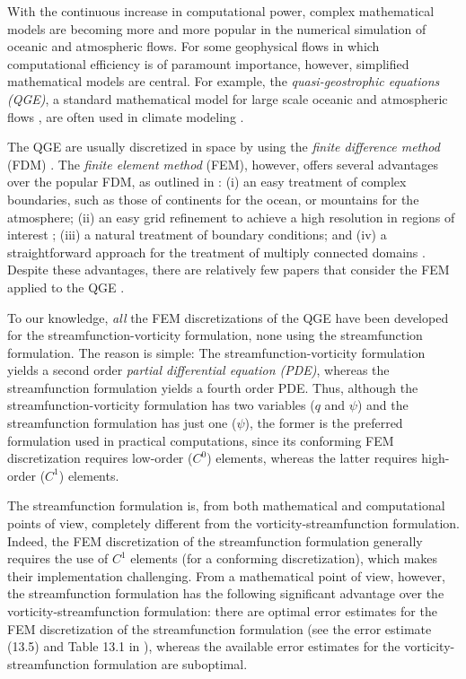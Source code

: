 With the continuous increase in computational power, complex mathematical models are becoming more
and more popular in the numerical simulation of oceanic and atmospheric flows. For some geophysical
flows in which computational efficiency is of paramount importance, however, simplified mathematical
models are central. For example, the \emph{quasi-geostrophic equations (QGE)}, a standard
mathematical model for large scale oceanic and atmospheric flows
\cite{Cushman11,Majda,Pedlosky92,Vallis06}, are often used in climate modeling \cite{Dijkstra05}.

The QGE are usually discretized in space by using the \emph{finite difference method} (FDM)
\cite{San11}. The \emph{finite element method} (FEM), however, offers several advantages over the
popular FDM, as outlined in \cite{Myers}: (i) an easy treatment of complex boundaries, such as those
of continents for the ocean, or mountains for the atmosphere; (ii) an easy grid refinement to
achieve a high resolution in regions of interest \cite{Cascon}; (iii) a natural treatment of
boundary conditions; and (iv) a straightforward approach for the treatment of multiply connected
domains \cite{Myers}. Despite these advantages, there are relatively few papers that consider the
FEM applied to the QGE \cite{Cascon, Fix, LeProvost94, Myers, Stevens82}.

To our knowledge, \emph{all} the FEM discretizations of the QGE have been developed for the
streamfunction-vorticity formulation, none using the streamfunction formulation. The reason is
simple: The streamfunction-vorticity formulation yields a second order \emph{partial differential
equation (PDE)}, whereas the streamfunction formulation yields a fourth order PDE. Thus, although
the streamfunction-vorticity formulation has two variables ($q$ and $\psi$) and the streamfunction
formulation has just one ($\psi$), the former is the preferred formulation used in practical
computations, since its conforming FEM discretization requires low-order ($C^0$) elements, whereas
the latter requires high-order ($C^1$) elements.

The streamfunction formulation is, from both mathematical and computational points of view,
completely different from the vorticity-streamfunction formulation. Indeed, the FEM discretization
of the streamfunction formulation generally requires the use of $C^1$ elements (for a conforming
discretization), which makes their implementation challenging. From a mathematical point of view,
however, the streamfunction formulation has the following significant advantage over the
vorticity-streamfunction formulation: there are optimal error estimates for the FEM discretization
of the streamfunction formulation (see the error estimate (13.5) and Table 13.1 in
\cite{Gunzburger89}), whereas the available error estimates for the vorticity-streamfunction
formulation are suboptimal.

